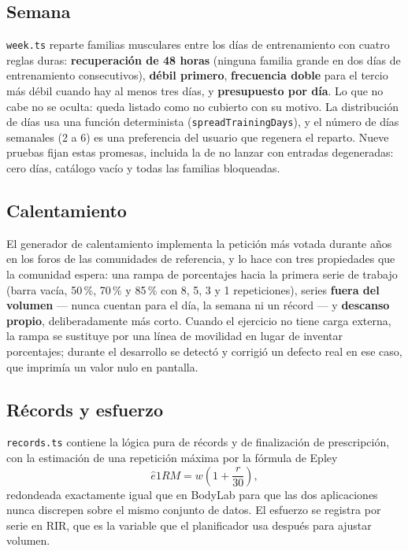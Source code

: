\documentclass[conference]{IEEEtran}
\newcommand{\code}[1]{\texttt{\small #1}}
\begin{document}
\subsection{Semana}
\code{week.ts} reparte familias musculares entre los d\'ias de entrenamiento con
cuatro reglas duras: \textbf{recuperaci\'on de 48 horas} (ninguna familia grande
en dos d\'ias de entrenamiento consecutivos), \textbf{d\'ebil primero},
\textbf{frecuencia doble} para el tercio m\'as d\'ebil cuando hay al menos tres
d\'ias, y \textbf{presupuesto por d\'ia}. Lo que no cabe no se oculta: queda
listado como no cubierto con su motivo. La distribuci\'on de d\'ias usa una
funci\'on determinista (\code{spreadTrainingDays}), y el n\'umero de d\'ias
semanales (2 a 6) es una preferencia del usuario que regenera el reparto. Nueve
pruebas fijan estas promesas, incluida la de no lanzar con entradas
degeneradas: cero d\'ias, cat\'alogo vac\'io y todas las familias bloqueadas.

\subsection{Calentamiento}
El generador de calentamiento implementa la petici\'on m\'as votada durante
a\~nos en los foros de las comunidades de referencia, y lo hace con tres
propiedades que la comunidad espera: una rampa de porcentajes hacia la primera
serie de trabajo (barra vac\'ia, 50\,\%, 70\,\% y 85\,\% con 8, 5, 3 y 1
repeticiones), series \textbf{fuera del volumen} --- nunca cuentan para el d\'ia,
la semana ni un r\'ecord --- y \textbf{descanso propio}, deliberadamente m\'as
corto. Cuando el ejercicio no tiene carga externa, la rampa se sustituye por una
l\'inea de movilidad en lugar de inventar porcentajes; durante el desarrollo se
detect\'o y corrigi\'o un defecto real en ese caso, que imprim\'ia un valor nulo
en pantalla.

\subsection{R\'ecords y esfuerzo}
\code{records.ts} contiene la l\'ogica pura de r\'ecords y de finalizaci\'on de
prescripci\'on, con la estimaci\'on de una repetici\'on m\'axima por la
f\'ormula de Epley
\begin{equation}
\hat{e}1RM = w \left(1 + \frac{r}{30}\right),
\end{equation}
redondeada exactamente igual que en BodyLab para que las dos aplicaciones nunca
discrepen sobre el mismo conjunto de datos. El esfuerzo se registra por serie en
RIR, que es la variable que el planificador usa despu\'es para ajustar volumen.
\end{document}

